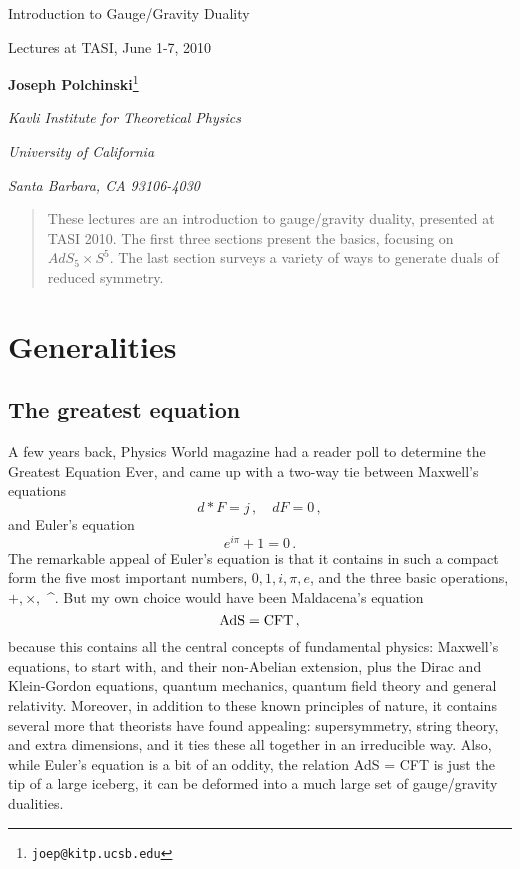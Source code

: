 \documentclass[12pt]{article}
\newcommand{\sect}[1]{\section{#1}\setcounter{equation}{0}}
\begin{document}

\begin{titlepage}

\centerline{\Large Introduction to Gauge/Gravity Duality}
\medskip
\centerline{\large Lectures at TASI, June 1-7, 2010}
\medskip

 \centerline{ {\bf Joseph Polchinski}\footnote{\tt joep@kitp.ucsb.edu}}
\medskip
\centerline{\em Kavli Institute for Theoretical Physics}
\centerline{\em University of California}
\centerline{\em Santa Barbara, CA 93106-4030}



\begin{abstract}
These lectures are an introduction to gauge/gravity duality, presented at TASI 2010.  The first three sections present the basics, focusing on $AdS_5 \times S^5$.  The last section surveys a variety of ways to generate duals of reduced symmetry.
\end{abstract}
\end{titlepage}
\setcounter{footnote}{0}

\tableofcontents

\sect{Generalities}

\subsection{The greatest equation}

A few years back, Physics World magazine had a reader poll to determine the Greatest Equation Ever, and came up with a two-way tie between Maxwell's equations
\begin{equation}
d*F=j\,,\quad dF=0\,,
\end{equation}             
and Euler's equation
\begin{equation}
e^{i\pi} + 1 = 0 \,.
\end{equation}             
The remarkable appeal of Euler's equation is that it contains in such a compact form the five most important numbers, $0, 1, i, \pi, e$, and the three basic operations, $+, \times,$ \^{}.  But my own choice would have been Maldacena's equation
\begin{equation}
{\rm AdS} = {\rm CFT} \,,
\end{equation}
because this contains all the central concepts of fundamental physics: Maxwell's equations, to start with, and their non-Abelian extension, plus the Dirac and Klein-Gordon equations, quantum mechanics, quantum field theory and general relativity.  Moreover, in addition to these known principles of nature, it contains several more that theorists have found appealing: supersymmetry, string theory, and extra dimensions, and it ties these all together in an irreducible way.  Also, while Euler's equation is a bit of an oddity, the relation AdS = CFT is just the tip of a large iceberg, it can be deformed into a much large set of gauge/gravity dualities.
\end{document}
